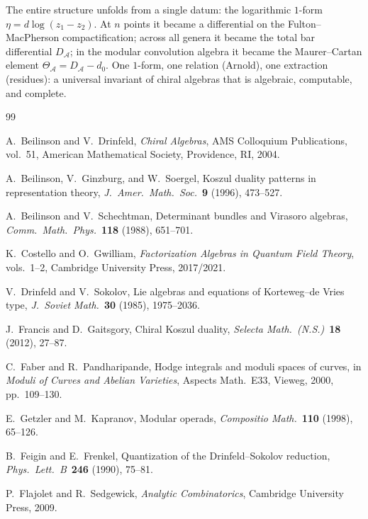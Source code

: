 \documentclass[11pt,reqno]{amsart}
\theoremstyle{definition}
\theoremstyle{remark}
\providecommand{\cA}{\mathcal{A}}
\numberwithin{equation}{section}
\begin{document}
\bigskip

\noindent
The entire structure unfolds from a single datum: the
logarithmic $1$-form $\eta = d\log(z_1 - z_2)$. At $n$ points
it became a differential on the Fulton--MacPherson
compactification; across all genera it became the total bar
differential $D_\cA$; in the modular convolution algebra it
became the Maurer--Cartan element $\Theta_\cA = D_\cA - d_0$.
One $1$-form, one relation (Arnold), one extraction (residues):
a universal invariant of chiral algebras that is algebraic,
computable, and complete.

\begin{thebibliography}{99}

A.~Beilinson and V.~Drinfeld,
\textit{Chiral Algebras},
AMS Colloquium Publications, vol.~51,
American Mathematical Society, Providence, RI, 2004.

A.~Beilinson, V.~Ginzburg, and W.~Soergel,
Koszul duality patterns in representation theory,
\textit{J.~Amer.\ Math.\ Soc.}~\textbf{9} (1996), 473--527.

A.~Beilinson and V.~Schechtman,
Determinant bundles and Virasoro algebras,
\textit{Comm.\ Math.\ Phys.}~\textbf{118} (1988), 651--701.

K.~Costello and O.~Gwilliam,
\textit{Factorization Algebras in Quantum Field Theory},
vols.~1--2, Cambridge University Press, 2017/2021.

V.~Drinfeld and V.~Sokolov,
Lie algebras and equations of Korteweg--de Vries type,
\textit{J.~Soviet Math.}~\textbf{30} (1985), 1975--2036.

J.~Francis and D.~Gaitsgory,
Chiral Koszul duality,
\textit{Selecta Math.\ (N.S.)}~\textbf{18} (2012), 27--87.

C.~Faber and R.~Pandharipande,
Hodge integrals and moduli spaces of curves,
in \textit{Moduli of Curves and Abelian Varieties},
Aspects Math.~E33, Vieweg, 2000, pp.~109--130.

E.~Getzler and M.~Kapranov,
Modular operads,
\textit{Compositio Math.}~\textbf{110} (1998), 65--126.

B.~Feigin and E.~Frenkel,
Quantization of the Drinfeld--Sokolov reduction,
\textit{Phys.\ Lett.\ B}~\textbf{246} (1990), 75--81.

P.~Flajolet and R.~Sedgewick,
\textit{Analytic Combinatorics},
Cambridge University Press, 2009.


\end{thebibliography}
\end{document}
